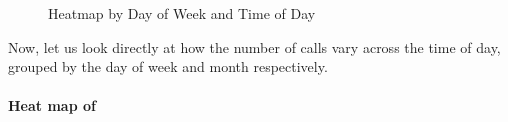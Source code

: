 \documentclass[
  letterpaper,
  DIV=11,
  numbers=noendperiod]{scrartcl}
\let\oldparagraph\paragraph
\renewcommand{\paragraph}[1]{\oldparagraph{#1}\mbox{}}
\begin{document}
\begin{figure}

\begin{minipage}[t]{\linewidth}

{\centering 


\caption{Heatmap by Day of Week and Time of Day}

}

\end{minipage}%

\end{figure}

Now, let us look directly at how the number of calls vary across the
time of day, grouped by the day of week and month respectively.

\hypertarget{heat-map-of}{%
\paragraph{Heat map of}\label{heat-map-of}}
\end{document}
